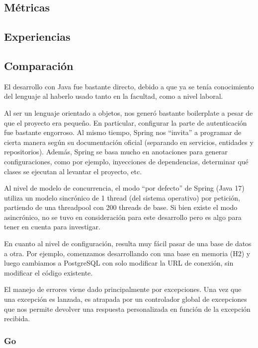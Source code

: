 \documentclass[11pt]{article}
\let\Oldsubsection\subsection
\renewcommand{\subsection}{\FloatBarrier\Oldsubsection}
\let\Oldsubsubsection\subsubsection
\renewcommand{\subsubsection}{\FloatBarrier\Oldsubsubsection}
\begin{document}
\subsection{Métricas}


\subsection{Experiencias}


\subsection{Comparación}

El desarrollo con Java fue bastante directo, debido a que ya se tenía conocimiento del lenguaje al haberlo usado tanto en la facultad, como a nivel laboral. 

Al ser un lenguaje orientado a objetos, nos generó bastante boilerplate a pesar de que el proyecto era pequeño. En particular, configurar la parte de autenticación fue bastante engorroso. Al mismo tiempo, Spring nos “invita” a programar de cierta manera según su documentación oficial (separando en servicios, entidades y repositorios). Además, Spring se basa mucho en anotaciones para generar configuraciones, como por ejemplo, inyecciones de dependencias, determinar qué clases se ejecutan al levantar el proyecto, etc.

Al nivel de modelo de concurrencia, el modo “por defecto” de Spring (Java 17) utiliza un modelo sincrónico de 1 thread (del sistema operativo) por petición, partiendo de una threadpool con 200 threads de base. Si bien existe el modo asincrónico, no se tuvo en consideración para este desarrollo pero es algo para tener en cuenta para investigar.

En cuanto al nivel de configuración, resulta muy fácil pasar de una base de datos a otra. Por ejemplo, comenzamos desarrollando con una base en memoria (H2) y luego cambiamos a PostgreSQL con solo modificar la URL de conexión, sin modificar el código existente.

El manejo de errores viene dado principalmente por excepciones. Una vez que una excepción es lanzada, es atrapada por un controlador global de excepciones que nos permite devolver una respuesta personalizada en función de la excepción recibida.

\subsubsection{Go}
\end{document}
